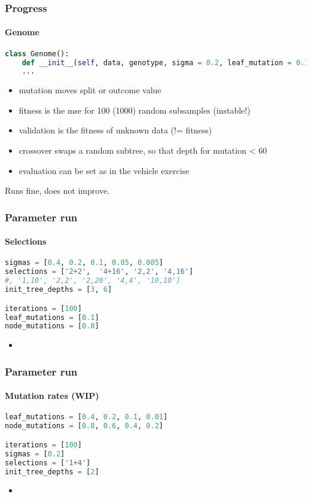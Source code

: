 \documentclass{beamer}
\begin{document}
\begin{frame}[fragile]
\frametitle{Progress}
\framesubtitle{Genome}

\begin{lstlisting}[language=Python]
class Genome():
    def __init__(self, data, genotype, sigma = 0.2, leaf_mutation = 0.1, node_mutation = 0.8, predict_feat = 'Energie'):
    ...
\end{lstlisting}

\begin{itemize}
\item mutation moves split or outcome value
\item fitness is the mse for 100 (1000) random subsamples (instable!)
\item validation is the fitness of unknown data (!= fitness)
\item crossover swaps a random subtree, so that depth for mutation < 60
\item evaluation can be set as in the vehicle exercise
\end{itemize}
\hbox{}
Runs fine, does not improve.
\end{frame}


\begin{frame}[fragile]
\frametitle{Parameter run}
\framesubtitle{Selections}
\begin{lstlisting}[language=Python]
sigmas = [0.4, 0.2, 0.1, 0.05, 0.005]
selections = ['2+2',  '4+16', '2,2', '4,16']
#, '1,10', '2,2', '2,20', '4,4', '10,10']
init_tree_depths = [3, 6]

iterations = [100]
leaf_mutations = [0.1]
node_mutations = [0.8]
\end{lstlisting}

\begin{itemize}
\item
\end{itemize}


\end{frame}


\begin{frame}[fragile]
\frametitle{Parameter run}
\framesubtitle{Mutation rates (WIP)}

\begin{lstlisting}[language=Python]
leaf_mutations = [0.4, 0.2, 0.1, 0.01]
node_mutations = [0.8, 0.6, 0.4, 0.2]

iterations = [100]
sigmas = [0.2]
selections = ['1+4']
init_tree_depths = [2]

\end{lstlisting}

\begin{itemize}
\item
\end{itemize}

\end{frame}
\end{document}
